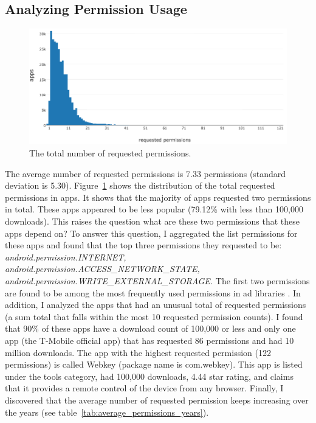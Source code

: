\subsection{Analyzing Permission Usage}
\begin{figure}[h]
	\includegraphics[scale=0.55]{figures/findings/total_permissions.png}
	\caption{The total number of requested permissions.}
	\label{fig:total_permissions}
\end{figure}
The average number of requested permissions is 7.33 permissions (standard deviation is 5.30).
Figure~\ref{fig:total_permissions} shows the distribution of the total requested permissions in apps.
It shows that the majority of apps requested two permissions in total.
These apps appeared to be less popular (79.12\% with less than 100,000 downloads).
This raises the question what are these two permissions that these apps depend on?
To answer this question, I aggregated the list permissions for these apps and found that the top three permissions they requested to be:
\textit{android.permission.INTERNET, android.permission.ACCESS\_NETWORK\_STATE, android.permission.WRITE\_EXTERNAL\_STORAGE.}
The first two permissions are found to be among the most frequently used permissions in ad libraries \cite{Liu_2015_MobiSys}.
In addition, I analyzed the apps that had an unusual total of requested permissions (a sum total that falls within the most 10 requested permission counts).
I found that 90\% of these apps have a download count of 100,000 or less and only one app (the T-Mobile official app) that has requested 86 permissions and had 10 million downloads.
The app with the highest requested permission (122 permissions) is called Webkey (package name is com.webkey).
This app is listed under the tools category, had 100,000 downloads, 4.44 star rating, and claims that it provides a remote control of the device from any browser.
Finally, I discovered that the average number of requested permission keeps increasing over the years (see table~\ref{tab:average_permissions_years}).
